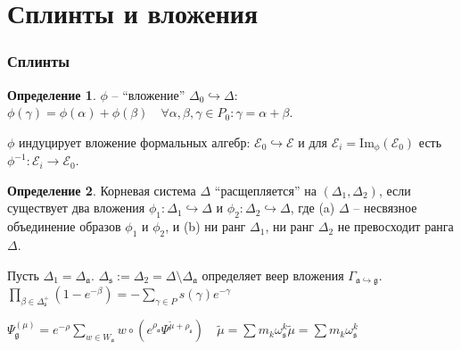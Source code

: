 \documentclass[pdftex]{beamer}
\newcommand{\gf}{\mathfrak{g}}
\newcommand{\af}{\mathfrak{a}}
\newcommand{\sfr}{\mathfrak{s}}
\theoremstyle{definition} \newtheorem{Def}{Определение}
\begin{document}
\section{Сплинты и вложения}
\begin{frame}
  \frametitle{Сплинты}
  \begin{Def}
$\phi $ -- ``вложение'' $\Delta_{0}\hookrightarrow \Delta$:
$\phi (\gamma )=\phi (\alpha )+\phi (\beta )\quad  \forall \alpha ,\beta ,\gamma \in P_{0}: \gamma =\alpha+\beta.$

\end{Def}
$\phi$ индуцирует вложение формальных алгебр: ${\mathcal{E}}_0\hookrightarrow \mathcal{E}$ и  для ${\mathcal{E}}_i=\mathrm{Im}_{\phi}\left( {\mathcal{E}}_0\right)$ есть $\phi^{-1}:{\mathcal{E}}_i \longrightarrow {\mathcal{E}}_0$.

\begin{Def}
Корневая система $\Delta$ ``расщепляется'' на  $(\Delta _{1},\Delta _{2})$, если существует два вложения  $\phi _{1}:\Delta _{1}\hookrightarrow \Delta $ и $\phi _{2}:\Delta _{2}\hookrightarrow \Delta $, где (a) $\Delta $ -- несвязное объединение образов $\phi _{1}$ и $\phi _{2}$, и (b) ни ранг  $\Delta _{1}$, ни ранг  $\Delta _{2}$ не превосходит ранга $\Delta $.
\end{Def}
Пусть $\Delta _{1}=\Delta _{\af}$. $\Delta _{\sfr}:=\Delta_{2}=\Delta \setminus \Delta _{\af}$ определяет  веер вложения  $\Gamma _{\af\hookrightarrow \gf}$. 
$\prod_{\beta \in \Delta _{\sfr}^{+}}\left( 1-e^{-\beta }\right)
=-\sum_{\gamma \in P}s(\gamma )e^{-\gamma }$

$\Psi _{\gf}^{\left( \mu \right) }=e^{-\rho}\sum_{w\in W_{\af}}w\circ \left(
e^{\rho _{\af}}\Psi ^{\widetilde{\mu }+\rho _{\sfr}}\right) \quad \widetilde{\mu }=\sum m_{k}\omega _{\sfr}^{k}\widetilde{\mu }=\sum m_{k}\omega _{\sfr}^{k}$

\end{frame}
\end{document}
